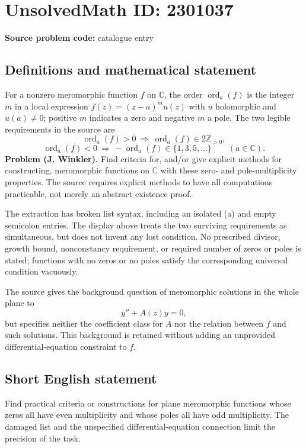 \documentclass[11pt]{article}
\begin{document}
\section*{UnsolvedMath ID: 2301037}
\textbf{Source problem code:} catalogue entry
\subsection{Definitions and mathematical statement}
For a nonzero meromorphic function $f$ on $\mathbb C$, the order $\operatorname{ord}_a(f)$ is the integer $m$ in a local expression $f(z)=(z-a)^m u(z)$ with $u$ holomorphic and $u(a)\ne0$; positive $m$ indicates a zero and negative $m$ a pole. The two legible requirements in the source are
\[
\operatorname{ord}_a(f)>0\ \Longrightarrow\ \operatorname{ord}_a(f)\in2\mathbb Z_{>0},
\]
\[
\operatorname{ord}_a(f)<0\ \Longrightarrow\ -\operatorname{ord}_a(f)\in\{1,3,5,\ldots\}
\qquad(a\in\mathbb C).
\]
\textbf{Problem (J. Winkler).} Find criteria for, and/or give explicit methods for constructing, meromorphic functions on $\mathbb C$ with these zero- and pole-multiplicity properties. The source requires explicit methods to have all computations practicable, not merely an abstract existence proof.

The extraction has broken list syntax, including an isolated (a) and empty semicolon entries. The display above treats the two surviving requirements as simultaneous, but does not invent any lost condition. No prescribed divisor, growth bound, nonconstancy requirement, or required number of zeros or poles is stated; functions with no zeros or no poles satisfy the corresponding universal condition vacuously.

The source gives the background question of meromorphic solutions in the whole plane to
\[
y''+A(z)y=0,
\]
but specifies neither the coefficient class for $A$ nor the relation between $f$ and such solutions. This background is retained without adding an unprovided differential-equation constraint to $f$.
\subsection{Short English statement}
Find practical criteria or constructions for plane meromorphic functions whose zeros all have even multiplicity and whose poles all have odd multiplicity. The damaged list and the unspecified differential-equation connection limit the precision of the task.
\end{document}

